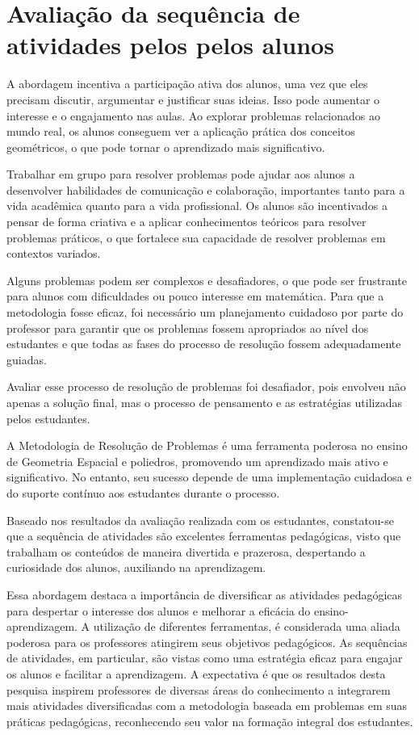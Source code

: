\section{Avaliação da sequência de atividades pelos pelos alunos}

A abordagem incentiva a participação ativa dos alunos, uma vez que eles precisam discutir, argumentar e justificar suas ideias. Isso pode aumentar o interesse e o engajamento nas aulas. Ao explorar problemas relacionados ao mundo real, os alunos conseguem ver a aplicação prática dos conceitos geométricos, o que pode tornar o aprendizado mais significativo.

Trabalhar em grupo para resolver problemas pode ajudar aos alunos a desenvolver habilidades de comunicação e colaboração, importantes tanto para a vida acadêmica quanto para a vida profissional. Os alunos são incentivados a pensar de forma criativa e a aplicar conhecimentos teóricos para resolver problemas práticos, o que fortalece sua capacidade de resolver problemas em contextos variados.

Alguns problemas podem ser complexos e desafiadores, o que pode ser frustrante para alunos com dificuldades ou pouco interesse em matemática. Para que a metodologia fosse eficaz, foi necessário um planejamento cuidadoso por parte do professor para garantir que os problemas fossem apropriados ao nível dos estudantes e que todas as fases do processo de resolução fossem adequadamente guiadas.

Avaliar esse processo de resolução de problemas foi desafiador, pois envolveu não apenas a solução final, mas o processo de pensamento e as estratégias utilizadas pelos estudantes.

A Metodologia de Resolução de Problemas é uma ferramenta poderosa no ensino de Geometria Espacial e poliedros, promovendo um aprendizado mais ativo e significativo. No entanto, seu sucesso depende de uma implementação cuidadosa e do suporte contínuo aos estudantes durante o processo.

Baseado nos resultados da avaliação realizada com os estudantes, constatou-se que a sequência de atividades são excelentes ferramentas pedagógicas, visto que trabalham os conteúdos de maneira divertida e prazerosa, despertando a curiosidade dos alunos, auxiliando na aprendizagem.

Essa abordagem destaca a importância de diversificar as atividades pedagógicas para despertar o interesse dos alunos e melhorar a eficácia do ensino-aprendizagem. A utilização de diferentes ferramentas, é considerada uma aliada poderosa para os professores atingirem seus objetivos pedagógicos. As sequências de atividades, em particular, são vistas como uma estratégia eficaz para engajar os alunos e facilitar a aprendizagem. A expectativa é que os resultados desta pesquisa inspirem professores de diversas áreas do conhecimento a integrarem mais atividades diversificadas com a metodologia baseada em problemas em suas práticas pedagógicas, reconhecendo seu valor na formação integral dos estudantes.

